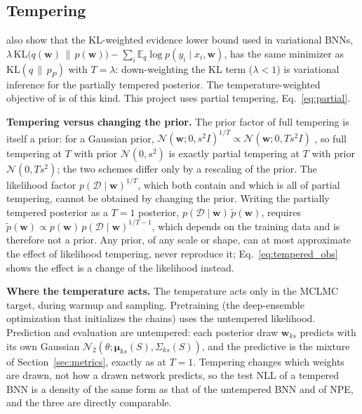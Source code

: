 \documentclass[11pt]{article}
\begin{document}
\subsection{Tempering}
\label{app:bg_tempering}
\citet[App.~E]{wenzel2020cold} also show
that the KL-weighted evidence lower bound used in variational BNNs,
$\lambda\,\mathrm{KL}\big(q(\mathbf w)\,\|\,p(\mathbf w)\big)-\sum_i\mathbb{E}_q\log p(y_i\mid x_i,\mathbf w)$, has the same
minimizer as $\mathrm{KL}(q\,\|\,p_P)$ with $T=\lambda$: down-weighting the KL term ($\lambda<1$) is variational
inference for the partially tempered posterior. The temperature-weighted objective of
\citet{delaunoy2024lowbudget} is of this kind. This project uses partial tempering, Eq.~\eqref{eq:partial}.

\textbf{Tempering versus changing the prior.} The prior factor of full tempering is itself a prior: for a Gaussian
prior, $\mathcal{N}(\mathbf w;0,s^2I)^{1/T}\propto\mathcal{N}(\mathbf w;0,Ts^2I)$ \citep[Sec.~2.2]{wenzel2020cold}, so full
tempering at $T$ with prior $\mathcal{N}(0,s^2)$ is exactly partial tempering at $T$ with prior $\mathcal{N}(0,Ts^2)$; the two
schemes differ only by a rescaling of the prior. The likelihood factor $p(\mathcal{D}\mid\mathbf w)^{1/T}$, which both
contain and which is all of partial tempering, cannot be obtained by changing the prior. Writing the partially
tempered posterior as a $T=1$ posterior, $p(\mathcal{D}\mid\mathbf w)\,\tilde p(\mathbf w)$, requires
$\tilde p(\mathbf w)\propto p(\mathbf w)\,p(\mathcal{D}\mid\mathbf w)^{1/T-1}$, which depends on the training data and is
therefore not a prior. Any prior, of any scale or shape, can at most approximate the effect of likelihood tempering,
never reproduce it; Eq.~\eqref{eq:tempered_obs} shows the effect is a change of the likelihood instead.

\textbf{Where the temperature acts.} The temperature acts only in the MCLMC target, during warmup and sampling. Pretraining (the
deep-ensemble optimization that initializes the chains) uses the untempered likelihood. Prediction and evaluation
are untempered: each posterior draw $\mathbf w_{ks}$ predicts with its own Gaussian
$\mathcal{N}_2(\theta;\boldsymbol\mu_{ks}(S),\Sigma_{ks}(S))$, and the predictive is the mixture of
Section~\ref{sec:metrics}, exactly as at $T=1$. Tempering changes which weights are drawn, not how a drawn network
predicts, so the test NLL of a tempered BNN is a density of the same form as that of the untempered BNN and of NPE,
and the three are directly comparable.
\end{document}
